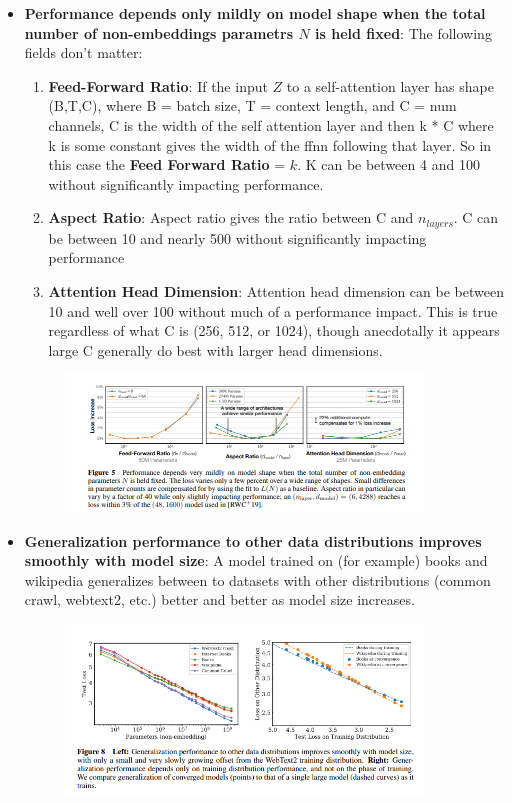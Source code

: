 \documentclass[12pt]{article}
\begin{document}
\begin{itemize}
\item \textbf{Performance depends only mildly on model shape when the total number of non-embeddings parametrs \(N\) is held fixed}: The following fields don't matter:
\begin{enumerate}
\item \textbf{Feed-Forward Ratio}: If the input \(Z\) to a self-attention layer has shape (B,T,C), where B = batch size, T = context length, and C = num channels, C is the width of the self attention layer and then k * C where k is some constant gives the width of the ffnn following that layer. So in this case the \textbf{Feed Forward Ratio} = \(k\). K can be between 4 and 100 without significantly impacting performance.
\item \textbf{Aspect Ratio}: Aspect ratio gives the ratio between C and \(n_{layers}\). C can be between 10 and nearly 500 without significantly impacting performance
\item \textbf{Attention Head Dimension}: Attention head dimension can be between 10 and well over 100 without much of a performance impact. This is true regardless of what C is (256, 512, or 1024), though anecdotally it appears large C generally do best with larger head dimensions.
\end{enumerate}
\begin{figure}[H]
    \centering
    \includegraphics[width=0.9\textwidth]{./ffnn_scaling.png} %
\end{figure}
\item \textbf{Generalization performance to other data distributions improves smoothly with model size}: A model trained on (for example) books and wikipedia generalizes between to datasets with other distributions (common crawl, webtext2, etc.) better and better as model size increases. 
\begin{figure}[H]
    \centering
    \includegraphics[width=0.9\textwidth]{./different_dists.png} %

\end{figure}
\end{itemize}
\end{document}
